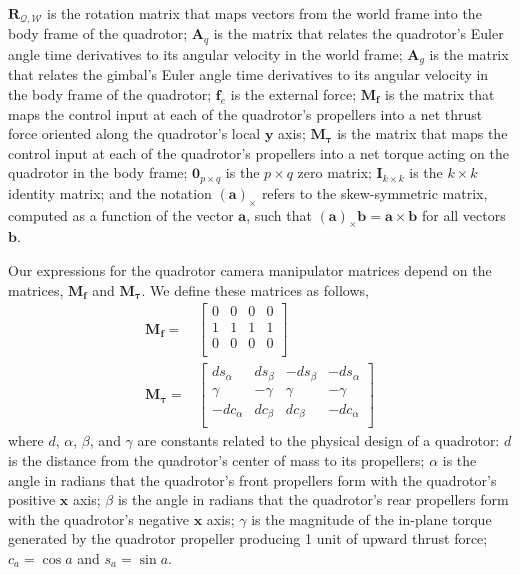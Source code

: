 $\mathbf{R}_{\mathcal{Q},\mathcal{W}}$ is the rotation matrix that maps vectors from the world frame into the body frame of the quadrotor;
$\mathbf{A}_q$ is the matrix that relates the quadrotor's Euler angle time derivatives to its angular velocity in the world frame;
$\mathbf{A}_g$ is the matrix that relates the gimbal's Euler angle time derivatives to its angular velocity in the body frame of the quadrotor;
$\mathbf{f}_e$ is the external force;
$\mathbf{M}_{\mathbf{f}}$ is the matrix that maps the control input at each of the quadrotor's propellers into a net thrust force oriented along the quadrotor's local $\mathbf{y}$ axis;
$\mathbf{M}_{\mathbf{\tau}}$ is the matrix that maps the control input at each of the quadrotor's propellers into a net torque acting on the quadrotor in the body frame;
$\mathbf{0}_{p \times q}$ is the $p \times q$ zero matrix;
$\mathbf{I}_{k \times k}$ is the $k \times k$ identity matrix;
and the notation $\left( \mathbf{a} \right)_{\times}$ refers to the skew-symmetric matrix, computed as a function of the vector $\mathbf{a}$, such that $\left(\mathbf{a}\right)_{\times}\mathbf{b} = \mathbf{a}\times\mathbf{b}$ for all vectors $\mathbf{b}$.

Our expressions for the quadrotor camera manipulator matrices depend on the matrices, $\mathbf{M}_{\mathbf{f}}$ and $\mathbf{M}_{\mathbf{\tau}}$.
We define these matrices as follows, 
%
\begin{equation}
\begin{aligned}
%
\mathbf{M}_{\mathbf{f}} = &
\begin{bmatrix}
0 & 0 & 0 & 0 \\
1 & 1 & 1 & 1 \\
0 & 0 & 0 & 0 \\
\end{bmatrix} \\
%
\mathbf{M}_{\mathbf{\tau}} = &
\begin{bmatrix}
 ds_\alpha & ds_\beta & -ds_\beta & -ds_\alpha \\
\gamma     & -\gamma  & \gamma    & -\gamma    \\
-dc_\alpha & dc_\beta & dc_\beta  & -dc_\alpha \\
\end{bmatrix}
%
\end{aligned}
\end{equation}
%
where $d$, $\alpha$, $\beta$, and $\gamma$ are constants related to the physical design of a quadrotor:
$d$ is the distance from the quadrotor's center of mass to its propellers;
$\alpha$ is the angle in radians that the quadrotor's front propellers form with the quadrotor's positive $\mathbf{x}$ axis;
$\beta$ is the angle in radians that the quadrotor's rear propellers form with the quadrotor's negative $\mathbf{x}$ axis;
$\gamma$ is the magnitude of the in-plane torque generated by the quadrotor propeller producing 1 unit of upward thrust force;
$c_a=\cos a$ and $s_a=\sin a$.

